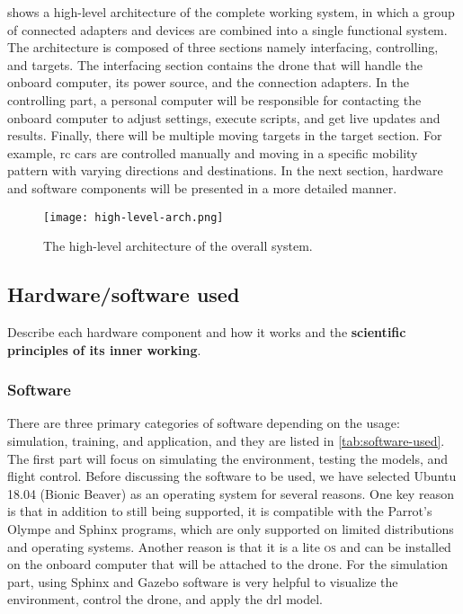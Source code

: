 \documentclass[../main.tex]{subfiles}
\begin{document}
 shows a high-level architecture 
of the complete working system, in which a group 
of connected adapters and devices are combined into 
a single functional system. 
The architecture is composed of three sections namely
interfacing, controlling, and targets. 
The interfacing section contains the drone that 
will handle the onboard computer, its power source, 
and the connection adapters. 
In the controlling part, a personal computer 
will be responsible for contacting the onboard computer 
to adjust settings, execute scripts, and get 
live updates and results. 
Finally, there will be multiple moving targets 
in the target section. For example, 
\gls{rc} cars are controlled manually and moving in 
a specific mobility pattern with varying directions 
and destinations. 
In the next section, hardware and software components 
will be presented in a more detailed manner.

\begin{figure}[tbp]
    \centering
    \texttt{[image: high-level-arch.png]}
    \caption{The high-level architecture of the overall system.}
    \label{fig:arch-fig}
\end{figure}

\subsection{Hardware/software used}

\begin{newrequirements}
    \begin{todolist}
    \item Describe each hardware component and how it works 
        and the \textbf{scientific principles of its 
        inner working}.
    \end{todolist}
\end{newrequirements}

\subsubsection{Software}

There are three primary categories of software 
depending on the usage: simulation, training, 
and application, and they are listed in \cref{tab:software-used}. The first part will focus on 
simulating the environment, testing the models, 
and flight control. Before discussing the software 
to be used, we have selected Ubuntu 18.04 (Bionic Beaver) 
as an operating system for several reasons. 
One key reason is that in addition to
still being supported, it is compatible with the 
Parrot's Olympe and Sphinx programs, which are only 
supported on limited distributions and operating systems.
Another reason is that it is a lite \textsc{os} 
and can be installed on the onboard computer that 
will be attached to the drone. For the simulation part, 
using Sphinx and Gazebo software is very helpful
to visualize the environment, control the drone, 
and apply the \gls{drl} model. 
\end{document}
